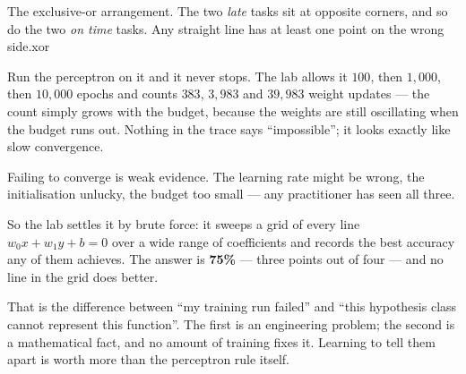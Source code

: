 %
{The exclusive-or arrangement. The two \emph{late} tasks sit at opposite corners,
and so do the two \emph{on time} tasks. Any straight line has at least one point on
the wrong side.}{xor}

Run the perceptron on it and it never stops. The lab allows it $100$, then $1{,}000$,
then $10{,}000$ epochs and counts $383$, $3{,}983$ and $39{,}983$ weight updates ---
the count simply grows with the budget, because the weights are still oscillating
when the budget runs out. Nothing in the trace says ``impossible''; it looks exactly
like slow convergence.

\begin{alertbox}
Failing to converge is weak evidence. The learning rate might be wrong, the
initialisation unlucky, the budget too small --- any practitioner has seen all
three.

So the lab settles it by brute force: it sweeps a grid of every line
$w_{0}x + w_{1}y + b = 0$ over a wide range of coefficients and records the best
accuracy any of them achieves. The answer is \textbf{75\%} --- three points out of
four --- and no line in the grid does better.

That is the difference between ``my training run failed'' and ``this hypothesis
class cannot represent this function''. The first is an engineering problem; the
second is a mathematical fact, and no amount of training fixes it. Learning to tell
them apart is worth more than the perceptron rule itself.
\end{alertbox}

